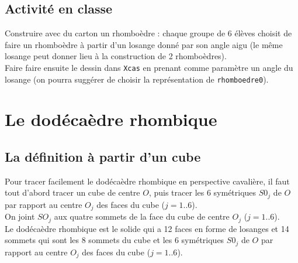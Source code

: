 \documentclass[a4paper,11pt]{book}
\begin{document}
\subsection{Activit\'e en classe}
Construire avec du carton un rhombo\`edre : chaque groupe de 6 \'el\`eves 
choisit de faire un rhombo\`edre \`a partir d'un losange donn\'e par son angle
aigu (le m\^eme losange peut donner lieu \`a la construction de 2  
rhombo\`edres).\\
Faire faire ensuite le dessin dans {\tt Xcas} en prenant comme param\`etre un 
angle du losange (on pourra sugg\'erer de choisir la repr\'esentation de 
{\tt rhomboedre0}).
\section{Le dod\'eca\`edre rhombique}
\subsection{La d\'efinition \`a partir d'un cube}
Pour tracer facilement le dod\'eca\`edre rhombique en perspective cavali\`ere, 
il faut tout d'abord tracer un cube de centre $O$, puis tracer les 6
sym\'etriques $S0_j$ de $O$ par rapport au centre $O_j$ des faces 
du cube ($j=1..6$).\\
On joint $SO_j$ aux quatre sommets de la face du cube de centre $O_j$ 
($j=1..6$).\\
Le dod\'eca\`edre rhombique est le solide qui a 12 
faces en forme de losanges et 14 sommets qui sont les 8 sommets du cube et les 
6 sym\'etriques $S0_j$ de $O$ par rapport au centre $O_j$ des faces du cube
($j=1..6$).
\end{document}
